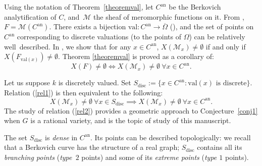 \documentclass[JEP,XML,SOM,Unicode,NoFloatCountersInSection,published]{cedram}
\newcommand{\val}{\mathrm{val}}
\theoremstyle{definition}
\begin{document}
Using the notation of Theorem~\ref{theoremval}, let $C^{\mathrm{an}}$ be the Berkovich analytification of $C$, and~$\mathscr{M}$ the sheaf of meromorphic functions on it. From \cite[Prop.\,3.6.2]{Ber90}, $F=\mathscr{M}(C^{\mathrm{an}})$. There exists a bijection $\val: C^{\mathrm{an}} \to \overline{\Omega}$ (\cf \cite[Prop.\,3.15]{une}), and the set of points on~$C^{\mathrm{an}}$ corresponding to discrete valuations (\ie to the points of $\Omega$) can be relatively well~described.
In \cite[Cor.\,3.17]{une}, we show that for any $x \in C^{\mathrm{an}}$, $X(\mathscr{M}_x) \neq \emptyset$ if and only if $X(F_{\val(x)}) \neq \emptyset$.
Theorem \ref{theoremval} is proved as a corollary of:
\[X(F) \neq \emptyset \iff X(\mathscr{M}_x) \neq \emptyset \ \forall x \in C^{\mathrm{an}}.\]

Let us suppose $k$ is discretely valued.
Set $S_{\mathrm{disc}}:=\{x \in C^{\mathrm{an}} : \val(x) \text{ is discrete}\}$. Relation (\ref{rel1}) is then equivalent to the following:
\begin{equation}\label{rel2} {X(\mathscr{M}_x) \neq \emptyset} \ {\forall x \in S_{\mathrm{disc}}} \implies
X(\mathscr{M}_x) \neq \emptyset \ \forall x \in C^{\mathrm{an}}.
\end{equation}
The study of relation (\ref{rel2}) provides a geometric approach to Conjecture~\ref{conj1} when $G$ is a rational variety, and is the topic of study of this manuscript.

The set $S_{\mathrm{disc}}$ is \emph{dense} in $C^{\mathrm{an}}$. Its points can be described topologically: we recall that a Berkovich curve has the structure of a real graph; $S_{\mathrm{disc}}$ contains all its \emph{branching points} (\ie \emph{type~$2$} points) and some of its \emph{extreme points} (\ie \emph{type $1$} points).
\end{document}
